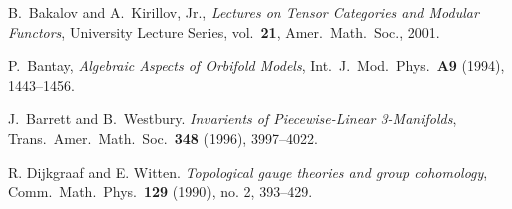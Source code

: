 \documentclass{amsart}
\begin{document}
\begin{thebibliography}{9999}



 B.\ Bakalov and A.\ Kirillov, Jr., {\em Lectures on
Tensor Categories and Modular Functors}, University Lecture Series,
vol.\ {\bf 21},  Amer.\ Math.\ Soc., 2001.

 P.\ Bantay, \emph{Algebraic Aspects of Orbifold Models}, Int.\ J.\ Mod.\ Phys.\ \textbf{A9} (1994), 1443--1456.

 J.\ Barrett and B.\ Westbury. {\em Invarients
of Piecewise-Linear 3-Manifolds}, Trans.\ Amer.\ Math.\ Soc.\ \textbf{348} (1996), 3997--4022.





 R. Dijkgraaf and E. Witten. \emph{Topological gauge theories and group cohomology}, Comm.\ Math.\ Phys.\ \textbf{129} (1990), no. 2, 393--429.





\end{thebibliography}
\end{document}
